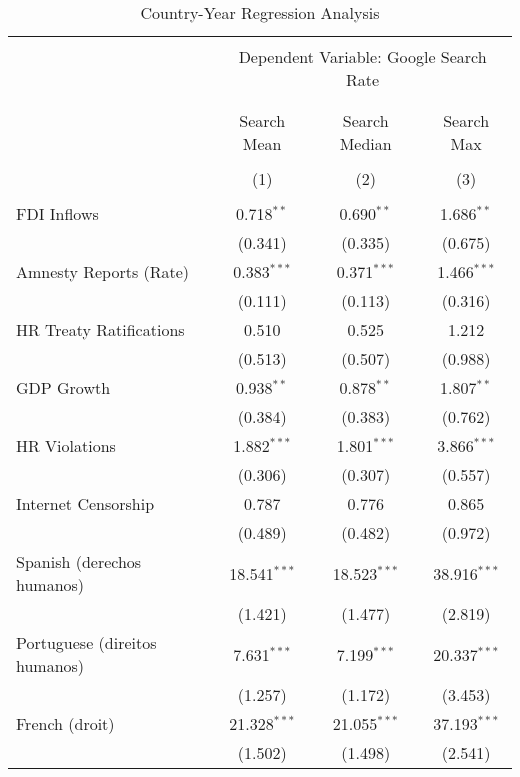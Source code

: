 
\begin{table}[!htbp] \centering 
  \caption{Country-Year Regression Analysis} 
  \label{} 
\begin{tabular}{@{\extracolsep{5pt}}lccc} 
\\[-1.8ex]\hline 
\hline \\[-1.8ex] 
 & \multicolumn{3}{c}{Dependent Variable: Google Search Rate} \\ 
\cline{2-4} 
\\[-1.8ex] & \multicolumn{3}{c}{ } \\ 
 & Search Mean & Search Median & Search Max \\ 
\\[-1.8ex] & (1) & (2) & (3)\\ 
\hline \\[-1.8ex] 
 FDI Inflows & 0.718$^{**}$ & 0.690$^{**}$ & 1.686$^{**}$ \\ 
  & (0.341) & (0.335) & (0.675) \\ 
  Amnesty Reports (Rate) & 0.383$^{***}$ & 0.371$^{***}$ & 1.466$^{***}$ \\ 
  & (0.111) & (0.113) & (0.316) \\ 
  HR Treaty Ratifications & 0.510 & 0.525 & 1.212 \\ 
  & (0.513) & (0.507) & (0.988) \\ 
  GDP Growth & 0.938$^{**}$ & 0.878$^{**}$ & 1.807$^{**}$ \\ 
  & (0.384) & (0.383) & (0.762) \\ 
  HR Violations & 1.882$^{***}$ & 1.801$^{***}$ & 3.866$^{***}$ \\ 
  & (0.306) & (0.307) & (0.557) \\ 
  Internet Censorship & 0.787 & 0.776 & 0.865 \\ 
  & (0.489) & (0.482) & (0.972) \\ 
  Spanish (derechos humanos) & 18.541$^{***}$ & 18.523$^{***}$ & 38.916$^{***}$ \\ 
  & (1.421) & (1.477) & (2.819) \\ 
  Portuguese (direitos humanos) & 7.631$^{***}$ & 7.199$^{***}$ & 20.337$^{***}$ \\ 
  & (1.257) & (1.172) & (3.453) \\ 
  French (droit) & 21.328$^{***}$ & 21.055$^{***}$ & 37.193$^{***}$ \\ 
  & (1.502) & (1.498) & (2.541) \\ 

\end{tabular}
\end{table}
